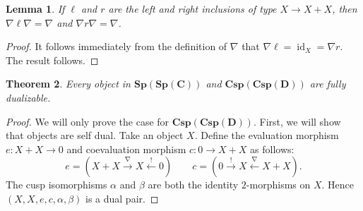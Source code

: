 \documentclass[11pt]{amsart}
\newcommand{\from}{\colon}
\newcommand{\xto}[1]{\xrightarrow{#1}}
\newcommand{\bispsp}[1]{\mathbf{Sp(Sp(#1))}}
\newcommand{\bicspcsp}[1]{\mathbf{Csp(Csp(#1))}}
\DeclareMathOperator{\id}{id}
\newtheorem{thm}{Theorem}[section]
\newtheorem{lem}[thm]{Lemma}
\theoremstyle{remark}
\theoremstyle{definition}
\begin{document}
\begin{lem}
	If $\ell$ and $r$ are the left and right inclusions of type $X \to X+X$, then $\nabla \ell \nabla = \nabla$ and $\nabla r \nabla = \nabla$.
\end{lem}

\begin{proof}
	It follows immediately from the definition of $\nabla$ that $\nabla \ell = \id_X = \nabla r$.  The result follows.  
\end{proof}

\begin{thm}
	\label{thm:SpansSpansAreFullyDualBicat}
	Every object in $\bispsp{C}$ and $\bicspcsp{D}$ are fully dualizable.
\end{thm}

\begin{proof}
	We will only prove the case for $\bicspcsp{D}$.  First, we will show that objects are self dual.  Take an object $X$. Define the evaluation morphism $e \from X+X \to 0$ and coevaluation morphism $c \from 0 \to X+X$ as follows:
	\[
		e = (X+X \xto{\nabla} X \xleftarrow{!} 0)
		\quad \quad
		c = (0 \xto{!} X \xleftarrow{\nabla} X+X ).
	\]
	The cusp isomorphisms $\alpha$ and $\beta$ are both the identity $2$-morphisms on $X$. Hence $(X,X,e,c,\alpha,\beta)$ is a dual pair.
	

\end{proof}
\end{document}
